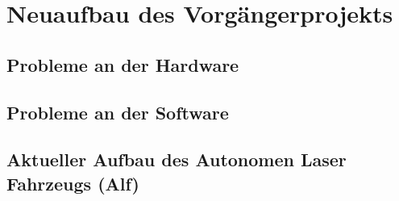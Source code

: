 

\chapter{Neuaufbau des Vorgängerprojekts}



\section{Probleme an der Hardware}

\section{Probleme an der Software}

\section{Aktueller Aufbau des Autonomen Laser Fahrzeugs (Alf)}